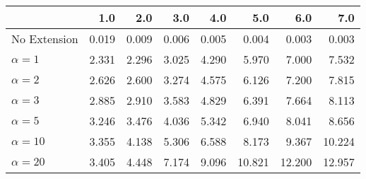 \begin{tabular}{lrrrrrrr}
\toprule
{} &   1.0 &   2.0 &   3.0 &   4.0 &    5.0 &    6.0 &    7.0 \\
\midrule
No Extension  & 0.019 & 0.009 & 0.006 & 0.005 &  0.004 &  0.003 &  0.003 \\
$\alpha = 1$  & 2.331 & 2.296 & 3.025 & 4.290 &  5.970 &  7.000 &  7.532 \\
$\alpha = 2$  & 2.626 & 2.600 & 3.274 & 4.575 &  6.126 &  7.200 &  7.815 \\
$\alpha = 3$  & 2.885 & 2.910 & 3.583 & 4.829 &  6.391 &  7.664 &  8.113 \\
$\alpha = 5$  & 3.246 & 3.476 & 4.036 & 5.342 &  6.940 &  8.041 &  8.656 \\
$\alpha = 10$ & 3.355 & 4.138 & 5.306 & 6.588 &  8.173 &  9.367 & 10.224 \\
$\alpha = 20$ & 3.405 & 4.448 & 7.174 & 9.096 & 10.821 & 12.200 & 12.957 \\
\bottomrule
\end{tabular}

